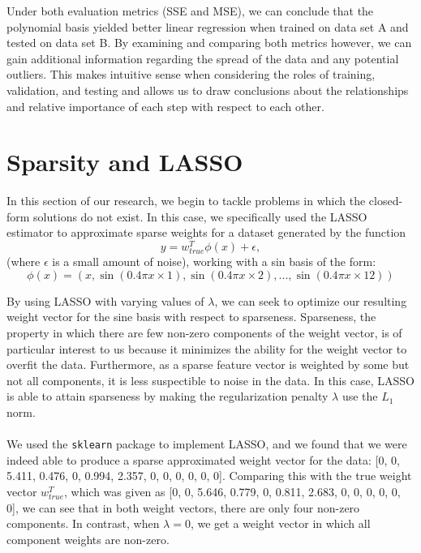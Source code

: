 \documentclass{article}
\begin{document}
Under both evaluation metrics (SSE and MSE), we can conclude that the polynomial basis yielded better linear regression when trained on data set A and tested on data set B. By examining and comparing both metrics however, we can gain additional information regarding the spread of the data and any potential outliers. This makes intuitive sense when considering the roles of training, validation, and testing and allows us to draw conclusions about the relationships and relative importance of each step with respect to each other.

\section{Sparsity and LASSO}
In this section of our research, we begin to tackle problems in which the closed-form solutions do not exist. In this case, we specifically used the LASSO estimator to approximate sparse weights for a dataset generated by the function
$$y = w^{T}_{true}\phi(x)+\epsilon,$$
(where $\epsilon$ is a small amount of noise), working with a sin basis of the form:
$$\phi(x) = (x, \sin(0.4\pi x \times 1), \sin(0.4\pi x \times 2), ... , \sin(0.4\pi x \times 12))$$

By using LASSO with varying values of $\lambda$, we can seek to optimize our resulting weight vector for the sine basis with respect to sparseness. Sparseness, the property in which there are few non-zero components of the weight vector, is of particular interest to us because it minimizes the ability for the weight vector to overfit the data. Furthermore, as a sparse feature vector is weighted by some but not all components, it is less suspectible to noise in the data. In this case, LASSO is able to attain sparseness by making the regularization penalty $\lambda$ use the $L_1$ norm. \\ \\

We used the \texttt{sklearn} package to implement LASSO, and we found that we were indeed able to produce a sparse approximated weight vector for the data: [0, 0, 5.411, 0.476, 0, 0.994, 2.357, 0, 0, 0, 0, 0, 0]. Comparing this with the true weight vector $w^{T}_{true}$, which was given as [0, 0, 5.646, 0.779, 0, 0.811, 2.683, 0, 0, 0, 0, 0, 0], we can see that in both weight vectors, there are only four non-zero components. In contrast, when $\lambda = 0$, we get a weight vector in which all component weights are non-zero. \\ \\
\end{document}

